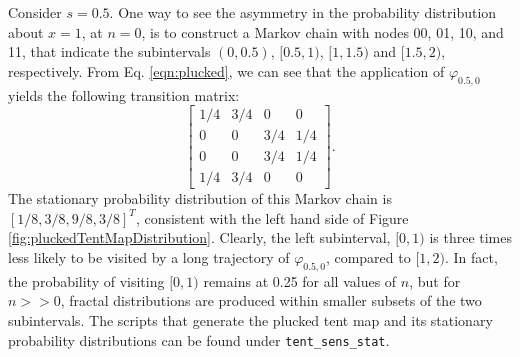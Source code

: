 Consider $s=0.5$. 
One way to see the asymmetry in the probability distribution 
about $x=1$, at $n=0$, is to construct a Markov chain with nodes 00, 01, 10, and 11, that indicate the subintervals $(0,0.5)$, $[0.5,1)$, 
$[1,1.5)$ and $[1.5,2)$, respectively. From Eq. \ref{eqn:plucked}, we can see that the application of $\varphi_{0.5,0}$ yields the following transition matrix:
\[
\begin{bmatrix}
		1/4 & 3/4 & 0 & 0 \\
		0 & 0 & 3/4 & 1/4 \\
		0 & 0 & 3/4 & 1/4 \\
		1/4 & 3/4 & 0 & 0
\end{bmatrix}
.\] 
The stationary probability distribution of this Markov chain is $[1/8, 3/8, 9/8, 3/8]^T$, consistent with the left hand side of Figure \ref{fig:pluckedTentMapDistribution}. Clearly, the left subinterval, $[0,1)$ is three times less likely to be visited by a long trajectory of $\varphi_{0.5,0}$, compared to $[1,2)$. In fact, the probability of visiting $[0,1)$ remains at 0.25 for all values of $n$, but for $n >> 0$, fractal distributions are produced within smaller subsets of the two subintervals. The scripts that generate the plucked tent map and its 
stationary probability distributions can be found under \verb+tent_sens_stat+. 


